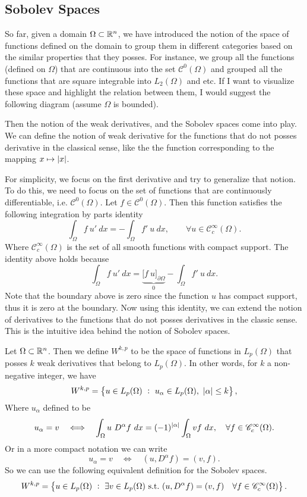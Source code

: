 \subsection{Sobolev Spaces}
So far, given a domain $ \Omega \subset \mathbb{R}^n $, we have introduced the notion of the space of functions defined on the domain to group them in different categories based on the similar properties that they posses. For instance, we group all the functions (defined on $ \Omega $) that are continuous into the set $ \mathscr{C}^0(\Omega) $ and grouped all the functions that are square integrable into $ L_2(\Omega) $ and etc. If I want to visualize these space and highlight the relation between them, I would suggest the following diagram (assume $ \Omega $ is bounded).

\FloatBarrier
\noindent Then the notion of the weak derivatives, and the Sobolev spaces come into play. We can define the notion of weak derivative for the functions that do not posses derivative in the classical sense, like the the function corresponding to the mapping $ x\mapsto |x| $. 

For simplicity, we focus on the first derivative and try to generalize that notion. To do this, we need to focus on the set of functions that are continuously differentiable, i.e. $ \mathscr{C}^0(\Omega) $. Let $ f\in \mathscr{C}^0(\Omega) $. Then this function satisfies the following integration by parts identity
\[  \boxed{\int_\Omega f\ u'\ dx =  -\int_\Omega f'\ u\ dx, \qquad \forall u \in \mathscr{C}^\infty_c(\Omega).} \]
Where $ \mathscr{C}^\infty_c(\Omega) $ is the set of all smooth functions with compact support. The identity above holds because
\[  \int_\Omega f\ u'\ dx  = \underbrace{\big[f\ u\big]_{\partial \Omega}}_{0}-\int_\Omega f'\ u\ dx . \]
Note that the boundary above is zero since the function $ u $ has compact support, thus it is zero at the boundary. Now using this identity, we can extend the notion of derivatives to the functions that do not posses derivatives in the classic sense. This is the intuitive idea behind the notion of Sobolev spaces. 

\begin{definition}
	Let $ \Omega\subset \mathbb{R}^n $. Then we define $ W^{k,p} $ to be the space of functions in $ L_p(\Omega) $ that posses $ k $ weak derivatives that belong to $ L_p(\Omega) $. In other words, for $ k $ a non-negative integer, we have
	\[ W^{k,p} = \left\{ u\in L_p(\Omega)\ :\  u_\alpha \in L_p(\Omega),\ |\alpha| \leq k  \right\}, \]
	Where $ u_\alpha $ defined to be
	\[  u_\alpha = v \quad \Longleftrightarrow \quad \int_\Omega u\ D^\alpha f\ dx = (-1)^{|\alpha|} \int_\Omega v f \ dx, \quad \forall f \in \mathscr{C}^\infty_c(\Omega). \]
	Or in a more compact notation we can write
	\[ u_\alpha = v \quad  \Longleftrightarrow \quad (u,D^\alpha f) = (v,f). \]
	So we can use the following equivalent definition for the Sobolev spaces.
	\[ W^{k,p} = \Set{u \in L_p(\Omega)\ :\ \exists v \in L_p(\Omega) \st (u,D^\alpha f) = (v,f) \quad \forall f \in \mathscr{C}^\infty_c(\Omega)}. \]
\end{definition}



